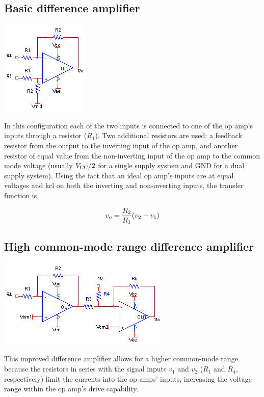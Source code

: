 \subsection{Basic difference amplifier}
\begin{center}
	\includegraphics{schematics/differenceamp.PNG}
\end{center}
In this configuration each of the two inputs is connected to one of the op amp's inputs through a resistor ($R_1$).
Two additional resistors are used:
a feedback resistor from the output to the inverting input of the op amp, and another resistor of equal value from the non-inverting input of the op amp to the common mode voltage (usually $V_\mathrm{CC}/2$ for a single supply system and GND for a dual supply system).
Using the fact that an ideal op amp's inputs are at equal voltages and \ac{kcl} on both the inverting and non-inverting inputs, the transfer function is

\textcolor{red}{
\begin{equation}
\vout = \frac{R_2}{R_1}(v_2 - v_1)
\label{eq:differenceamp}
\end{equation}
}

\subsection{High common-mode range difference amplifier}
\begin{center}
	\includegraphics{schematics/highcmdifferenceamplifier.PNG}
\end{center}
This improved difference amplifier allows for a higher common-mode range because the resistors in series with the signal inputs $v_1$ and $v_2$ ($R_1$ and $R_4$, respectively) limit the currents into the op amps' inputs, increasing the voltage range within the op amp's drive capability. \autocite[418]{op-amps-for-everyone}

